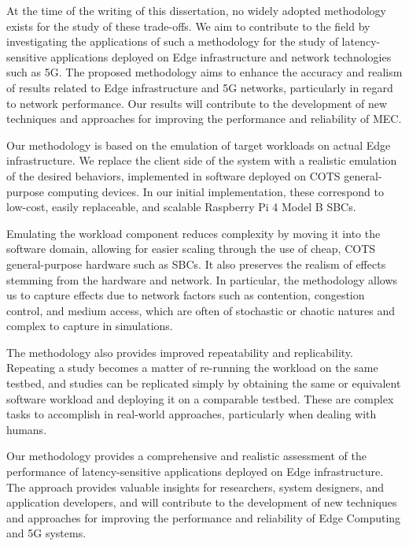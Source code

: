 At the time of the writing of this dissertation, no widely adopted methodology exists for the study of these trade-offs.
We aim to contribute to the field by investigating the applications of such a methodology for the study of latency-sensitive applications deployed on Edge infrastructure and network technologies such as 5G.
The proposed methodology aims to enhance the accuracy and realism of results related to Edge infrastructure and 5G networks, particularly in regard to network performance.
Our results will contribute to the development of new techniques and approaches for improving the performance and reliability of \gls{MEC}.

Our methodology is based on the emulation of target workloads on actual Edge infrastructure.
We replace the client side of the system with a realistic emulation of the desired behaviors, implemented in software deployed on \gls{COTS} general-purpose computing devices.
In our initial implementation, these correspond to low-cost, easily replaceable, and scalable Raspberry Pi 4 Model B \glspl{SBC}.

Emulating the workload component reduces complexity by moving it into the software domain, allowing for easier scaling through the use of cheap, COTS general-purpose hardware such as \glspl{SBC}.
It also preserves the realism of effects stemming from the hardware and network.
In particular, the methodology allows us to capture effects due to network factors such as contention, congestion control, and medium access, which are often of stochastic or chaotic natures and complex to capture in simulations.

The methodology also provides improved repeatability and replicability.
Repeating a study becomes a matter of re-running the workload on the same testbed, and studies can be replicated simply by obtaining the same or equivalent software workload and deploying it on a comparable testbed.
These are complex tasks to accomplish in real-world approaches, particularly when dealing with humans.

Our methodology provides a comprehensive and realistic assessment of the performance of latency-sensitive applications deployed on Edge infrastructure.
The approach provides valuable insights for researchers, system designers, and application developers, and will contribute to the development of new techniques and approaches for improving the performance and reliability of Edge Computing and 5G systems.


